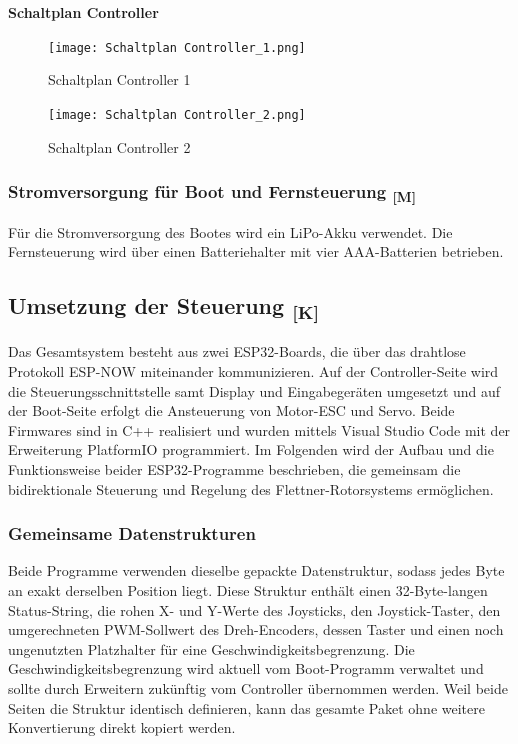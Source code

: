 \documentclass[a4paper,12pt]{article}
\begin{document}
\newpage
\textbf{Schaltplan Controller}

\begin{figure}[H]
    \centering
    \texttt{[image: Schaltplan Controller\_1.png]}
    \caption{Schaltplan Controller 1}
    \label{fig:Schaltplan Controller 1}
\end{figure}

\begin{figure}[H]
    \centering
    \texttt{[image: Schaltplan Controller\_2.png]}
    \caption{Schaltplan Controller 2}
    \label{fig:Schaltplan Controller 2}
\end{figure}

\subsubsection{\texorpdfstring{Stromversorgung für Boot und Fernsteuerung \textsubscript{[M]}}{Stromversorgung für Boot und Fernsteuerung [M]}}

Für die Stromversorgung des Bootes wird ein LiPo-Akku verwendet. Die Fernsteuerung wird über einen Batteriehalter mit vier AAA-Batterien betrieben.\cite{LiPo_Akku}\cite{Batterie_Halter}

\newpage

\subsection{\texorpdfstring{Umsetzung der Steuerung \textsubscript{[K]}}{Umsetzung der Steuerung [K]}}

Das Gesamtsystem besteht aus zwei ESP32-Boards, die über das drahtlose Protokoll ESP-NOW miteinander kommunizieren. Auf der Controller-Seite wird die Steuerungsschnittstelle samt Display und Eingabegeräten umgesetzt und auf der Boot-Seite erfolgt die Ansteuerung von Motor-ESC und Servo. Beide Firmwares sind in C++ realisiert und wurden mittels Visual Studio Code mit der Erweiterung PlatformIO programmiert. Im Folgenden wird der Aufbau und die Funktionsweise beider ESP32-Programme beschrieben, die gemeinsam die bidirektionale Steuerung und Regelung des Flettner-Rotorsystems ermöglichen. 


\subsubsection{Gemeinsame Datenstrukturen}

Beide Programme verwenden dieselbe gepackte Datenstruktur, sodass jedes Byte an exakt derselben Position liegt. Diese Struktur enthält einen 32-Byte-langen Status-String, die rohen X- und Y-Werte des Joysticks, den Joystick-Taster, den umgerechneten PWM-Sollwert des Dreh-Encoders, dessen Taster und einen noch ungenutzten Platzhalter für eine Geschwindigkeitsbegrenzung. Die Geschwindigkeitsbegrenzung wird aktuell vom Boot-Programm verwaltet und sollte durch Erweitern zukünftig vom Controller übernommen werden. Weil beide Seiten die Struktur identisch definieren, kann das gesamte Paket ohne weitere Konvertierung direkt kopiert werden.
\end{document}
